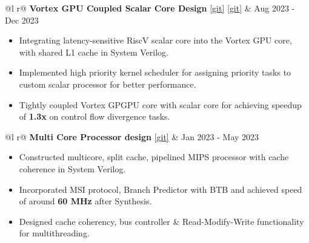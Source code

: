 \documentclass[a4paper,10pt]{article}
\begin{document}
\begin{tabularx}{\linewidth}{ @{}l r@{} }
    \textbf{Vortex GPU Coupled Scalar Core Design} \href{https://gitfront.io/r/Sharath/tkpYU7EunMqf/GPU-scalar-riscV-design/}{[\underline{git}]} \href{https://github.com/TehkCode/Vortex-Purdue/tree/ArchV1_3}{[\underline{git}]} & \hfill {\small Aug 2023 - Dec 2023} \\[2.75pt]
    {
        \begin{minipage}[t]{\linewidth}
            \begin{itemize}[nosep,after=\strut, leftmargin=2em, itemsep=3pt]
                \item Integrating latency-sensitive RiscV scalar core into the Vortex GPU core, with shared L1 cache in System Verilog.
                \item Implemented high priority kernel scheduler for assigning priority tasks to custom scalar processor for better performance.
                \item Tightly coupled Vortex GPGPU core with scalar core for achieving speedup of \textbf{1.3x} on control flow divergence tasks. 
            \end{itemize}
        \end{minipage}
    } 
\end{tabularx}
\vspace{0.1cm}

\begin{tabularx}{\linewidth}{ @{}l r@{} }
    \textbf{Multi Core Processor design} \href{https://gitfront.io/r/Sharath/YQcLhKyPxPYD/CPU-desgin/}{[\underline{git}]} & \hfill {\small Jan 2023 - May 2023} \\[2.75pt]
    {
        \begin{minipage}[t]{\linewidth}
            \begin{itemize}[nosep, after=\strut, leftmargin=2em, itemsep=3pt]
                \item Constructed multicore, split cache, pipelined MIPS processor with cache coherence in System Verilog.
                \item Incorporated MSI protocol, Branch Predictor with BTB and achieved speed of around \textbf{60 MHz} after Synthesis.
                \item Designed cache coherency, bus controller \& Read-Modify-Write functionality for multithreading.
            \end{itemize}
        \end{minipage}
    }  
\end{tabularx}
\vspace{0.1cm}
\end{document}
